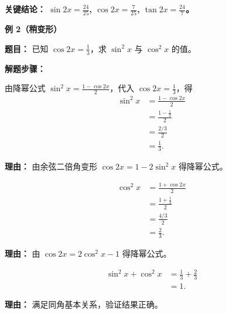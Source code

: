 \begin{examplebox}
	\textbf{\textcolor{CExample}{关键结论：}} \textbf{$\sin 2x = \frac{24}{25}$, $\cos 2x = \frac{7}{25}$, $\tan 2x = \frac{24}{7}$。}

	\medskip
	\textbf{\textcolor{CExample}{例 2（稍变形）}}

	\textbf{\textcolor{CExample}{题目：}} 已知 $\cos 2x = \frac{1}{3}$，求 $\sin^2 x$ 与 $\cos^2 x$ 的值。

	\textbf{\textcolor{CExample}{解题步骤：}}
	\begin{description}[style=nextline, leftmargin=2.8em, labelsep=0.5em, itemsep=0.45em]
		\item[\textbf{第一步（正弦降幂）：}] 由降幂公式 $\sin^2 x = \frac{1 - \cos 2x}{2}$，代入 $\cos 2x = \frac{1}{3}$，得
		      \[
			      \begin{aligned}
				      \sin^2 x & = \frac{1 - \cos 2x}{2}     \\
				               & = \frac{1 - \frac{1}{3}}{2} \\
				               & = \frac{2/3}{2}             \\
				               & = \frac{1}{3}.
			      \end{aligned}
		      \]
		      \par\textbf{理由：} 由余弦二倍角变形 $\cos 2x = 1 - 2\sin^2 x$ 得降幂公式。

		\item[\textbf{第二步（余弦降幂）：}]
		      \[
			      \begin{aligned}
				      \cos^2 x & = \frac{1 + \cos 2x}{2}     \\
				               & = \frac{1 + \frac{1}{3}}{2} \\
				               & = \frac{4/3}{2}             \\
				               & = \frac{2}{3}.
			      \end{aligned}
		      \]
		      \par\textbf{理由：} 由 $\cos 2x = 2\cos^2 x - 1$ 得降幂公式。

		\item[\textbf{第三步（平方验证）：}]
		      \[
			      \begin{aligned}
				      \sin^2 x + \cos^2 x & = \frac{1}{3} + \frac{2}{3} \\
				                          & = 1.
			      \end{aligned}
		      \]
		      \par\textbf{理由：} 满足同角基本关系，验证结果正确。
	\end{description}


\end{examplebox}
